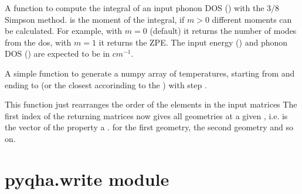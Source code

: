 \documentclass[letterpaper,10pt,english]{sphinxmanual}
\begin{document}

\begin{fulllineitems}
A function to compute the integral of an input phonon DOS () with the 3/8 Simpson method.
 is the moment of the integral, if \(m>0\) different moments can be calculated.
For example, with \(m=0\) (default) it returns the number of modes from the dos, 
with \(m=1\) it returns the ZPE. The input energy () and phonon DOS () are expected to be in
\(cm^{-1}\).

\end{fulllineitems}


\begin{fulllineitems}
A simple function to generate a numpy array of temperatures, starting from
 and ending to  (or the closest  accorinding to the  )
with step  .

\end{fulllineitems}


\begin{fulllineitems}
This function just rearranges the order of the elements in the input matrices
The first index of the returning matrices  now gives all geometries at a given
, i.e.  is the vector of the property  a  .  for the first 
geometry,  the second geometry and so on.

\end{fulllineitems}



\section{pyqha.write module}
\label{pyqha:pyqha-write-module}\label{pyqha:module-pyqha.write}
\end{document}
